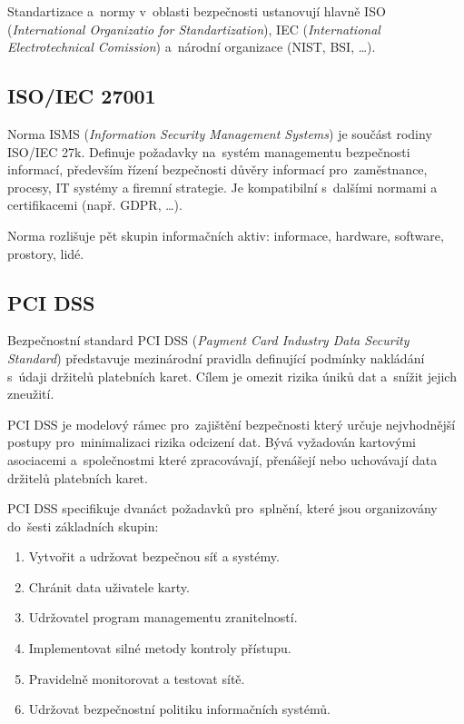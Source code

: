 Standartizace a~normy v~oblasti bezpečnosti ustanovují hlavně
ISO (\emph{International Organizatio for Standartization}),
IEC (\emph{International Electrotechnical Comission}) a~národní organizace (NIST, BSI, \dots).


\subsection{ISO/IEC 27001}

Norma ISMS (\emph{Information Security Management Systems}) je součást rodiny ISO/IEC 27k.
Definuje požadavky na~systém managementu bezpečnosti informací, především řízení bezpečnosti důvěry informací pro~zaměstnance, procesy, IT systémy a firemní strategie.
Je kompatibilní s~dalšími normami a certifikacemi (např. GDPR, \dots).

Norma rozlišuje pět skupin informačních aktiv: informace, hardware, software, prostory, lidé.


\subsection{PCI DSS}

Bezpečnostní standard PCI DSS (\emph{Payment Card Industry Data Security Standard}) představuje mezinárodní pravidla definující podmínky nakládání s~údaji držitelů platebních karet.
Cílem je omezit rizika úniků dat a~snížit jejich zneužití.

PCI DSS je modelový rámec pro~zajištění bezpečnosti který určuje nejvhodnější postupy pro~minimalizaci rizika odcizení dat.
Bývá vyžadován kartovými asociacemi a~společnostmi které zpracovávají, přenášejí nebo uchovávají data držitelů platebních karet.

PCI DSS specifikuje dvanáct požadavků pro~splnění, které jsou organizovány do~šesti základních skupin:
\vspace*{-0.5em}\begin{enumerate}
\item Vytvořit a udržovat bezpečnou síť a systémy.
\item Chránit data uživatele karty.
\item Udržovatel program managementu zranitelností.
\item Implementovat silné metody kontroly přístupu.
\item Pravidelně monitorovat a testovat sítě.
\item Udržovat bezpečnostní politiku informačních systémů.
\end{enumerate}

